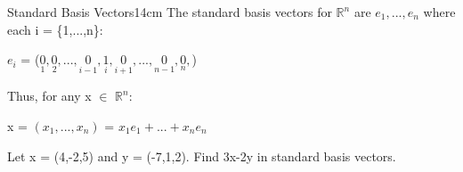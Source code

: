     \vspace{0.5cm}



    \begin{definition}{Standard Basis Vectors}{14cm}
        The {\color{lblue} standard basis vectors} for $\mathbb{R}^n$
        are $e_1,...,e_n$ where each i = \{1,...,n\}:

        \hspace{0.5cm}
        $e_i$ = ($\underset{\scriptscriptstyle 1}{0},
                    \underset{\scriptscriptstyle 2}{0},...,
                    \underset{\scriptscriptstyle i-1}{0},
                    \underset{\scriptscriptstyle i}{1},
                    \underset{\scriptscriptstyle i+1}{0},...,
                    \underset{\scriptscriptstyle n-1}{0},
                    \underset{\scriptscriptstyle n}{0},$)

        Thus, for any x $\in$ $\mathbb{R}^n$:

        \hspace{0.5cm}
        x = $(x_1,...,x_n)$
        = $x_1e_1 + ... + x_ne_n$
    \end{definition}

    \vspace{0.5cm}



    \begin{example}
        Let x = (4,-2,5) and y = (-7,1,2). Find 3x-2y in standard basis vectors.
    \end{example}

